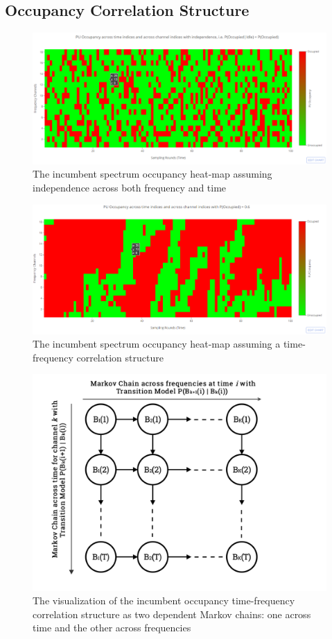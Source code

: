 \documentclass[12pt, draftcls, onecolumn]{IEEEtran}
\begin{document}
\subsection{Occupancy Correlation Structure}\label{I.II}
\begin{figure} [htb]
    \centerline{
    \includegraphics[width = 1.0\textwidth]{Independence.PNG}}
    \caption{The incumbent spectrum occupancy heat-map assuming independence across both frequency and time}
    \label{fig:A.1}
\end{figure}
\begin{figure} [htb]
    \centerline{
    \includegraphics[width = 1.0\textwidth]{Space_Time_Corr.PNG}}
    \caption{The incumbent spectrum occupancy heat-map assuming a time-frequency correlation structure}
    \label{fig:A.2}
\end{figure}
\begin{figure} [htb]
    \centerline{
    \includegraphics[width = 1.0\textwidth]{MarkovChainsVisualization.png}}
    \caption{The visualization of the incumbent occupancy time-frequency correlation structure as two dependent Markov chains: one across time and the other across frequencies}
    \label{fig:A.3}
\end{figure}
\end{document}

